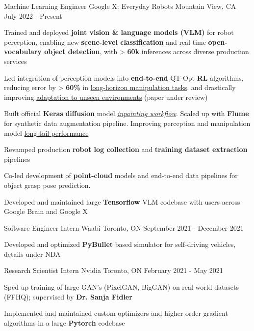 
\begin{cventries}
  \cventry
    {Machine Learning Engineer} %
    {Google X: Everyday Robots} %
    {Mountain View, CA} %
    {July 2022 - Present} %
    {
      \begin{cvitems} %
        \item {Trained and deployed \textbf{joint vision \& language models (VLM)} for robot perception, enabling new \textbf{scene-level classification} and real-time \textbf{open-vocabulary object detection}, with > \textbf{60k} inferences across diverse production services}
        \item {Led integration of perception models into \textbf{end-to-end} QT-Opt \textbf{RL} algorithms, reducing error by > \textbf{60\%} in \underline{long-horizon manipulation tasks}, and drastically improving \underline{adaptation to unseen environments} (paper under review)}
        \item {Built official \textbf{Keras} \textbf{diffusion} model \href{https://github.com/keras-team/keras-cv/pull/973}{\underline{\textit{inpainting workflow}}}. Scaled up with \textbf{Flume} for synthetic data augmentation pipeline. Improving perception and manipulation model \underline{long-tail performance}}
        \item {Revamped production \textbf{robot log collection} and \textbf{training dataset extraction} pipelines}
        \item {Co-led development of \textbf{point-cloud} models and end-to-end data pipelines for object grasp pose prediction.}
        \item {Developed and maintained large \textbf{Tensorflow} VLM codebase with users across Google Brain and Google X}
      \end{cvitems}
    }

  \cventry
    {Software Engineer Intern}
    {Waabi}
    {Toronto, ON}
    {September 2021 - December 2021}
    {
      \begin{cvitems}
        \item {Developed and optimized \textbf{PyBullet} based simulator for self-driving vehicles, details under NDA}
      \end{cvitems}
    }

  \cventry
    {Research Scientist Intern} %
    {Nvidia} %
    {Toronto, ON} %
    {February 2021 - May 2021} %
    {
      \begin{cvitems} %
        \item {Sped up training of large GAN's (PixelGAN, BigGAN) on real-world datasets (FFHQ); supervised by \textbf{Dr. Sanja Fidler}}
        \item {Implemented and maintained custom optimizers and higher order gradient algorithms in a large \textbf{Pytorch} codebase}
      \end{cvitems}
    }
  

\end{cventries}
